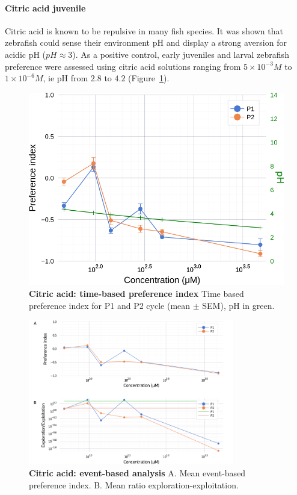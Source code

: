   \paragraph{Citric acid juvenile}
  Citric acid is known to be repulsive in many fish species. It was shown that zebrafish could sense their environment pH \cite{abreu2016acute, abreu2016behavioral} and display a strong aversion for acidic pH ($pH \approx 3$). As a positive control, early juveniles and larval zebrafish preference were assessed using citric acid solutions ranging from $5 \times 10^{-3} M$ to $1 \times 10^{-6} M$, ie pH from $2.8$ to $4.2$ (Figure~\ref{citric_acid}).
    \begin{figure}[h!]
      \centering
      \includegraphics[width=.6\textwidth]{part_2/assets/citricacid.png}
      \caption{\textbf{Citric acid: time-based preference index} Time based preference index for P1 and P2 cycle (mean $\pm$ SEM), pH in green. }
      \label{citric_acid}
    \end{figure}
    \begin{figure}[h!]
      \centering
      \includegraphics[width=0.8\textwidth]{part_2/assets/citricacid_event.png}
      \caption{\textbf{Citric acid: event-based analysis} A. Mean event-based preference index. B. Mean ratio exploration-exploitation.}
      \label{citric_acid_event}
    \end{figure}

